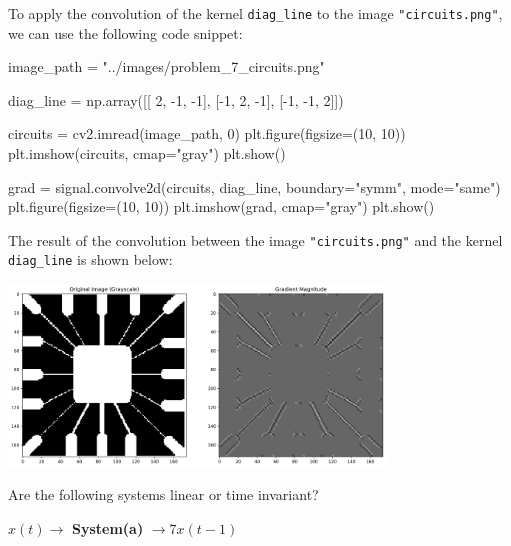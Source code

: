 \documentclass[a4paper, 10pt]{article}
\begin{document}
\newpage

\begin{solution}
To apply the convolution of the kernel \texttt{diag\_line} to the image \texttt{"circuits.png"}, we can use the following code snippet:

\begin{codingbox}
image_path = "../images/problem_7_circuits.png"

diag_line = np.array([[ 2, -1, -1],
                    [-1, 2, -1],
                    [-1, -1, 2]])

circuits = cv2.imread(image_path, 0)
plt.figure(figsize=(10, 10))
plt.imshow(circuits, cmap="gray")
plt.show()

grad = signal.convolve2d(circuits, diag_line, boundary="symm", mode="same")
plt.figure(figsize=(10, 10))
plt.imshow(grad, cmap="gray")
plt.show()
\end{codingbox}

The result of the convolution between the image \texttt{"circuits.png"} and the kernel \texttt{diag\_line} is shown below:
\begin{center}
    \includegraphics[width=0.75\textwidth]{images/problem_7_circuits_gradient.png}
\end{center}
\end{solution}

\newpage

\begin{problem}
Are the following systems linear or time invariant?
\end{problem}

\begin{subproblems}[start=1]
    \item \( x(t) \rightarrow \) \textbf{System(a)} \( \rightarrow 7x(t-1) \)
\end{subproblems}
\end{document}
